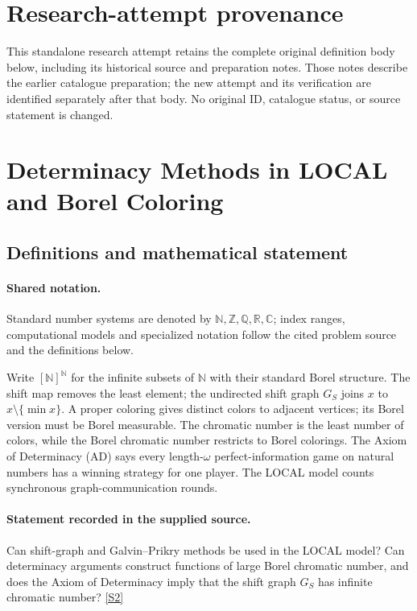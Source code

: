 \documentclass[11pt]{article}
\begin{document}
\section*{Research-attempt provenance}
This standalone research attempt retains the complete original definition body below,
including its historical source and preparation notes. Those notes describe the
earlier catalogue preparation; the new attempt and its verification are identified
separately after that body. No original ID, catalogue status, or source statement is changed.

\section{Determinacy Methods in LOCAL and Borel Coloring}\label{statement}

\subsection{Definitions and mathematical statement}

\paragraph{Shared notation.}Standard number systems are denoted by $\mathbb N,\mathbb Z,\mathbb Q,\mathbb R,\mathbb C$; index ranges, computational models and specialized notation follow the cited problem source and the definitions below.


Write $[\mathbb N]^{\mathbb N}$ for the infinite subsets of $\mathbb N$ with their standard Borel structure. The shift map removes the least element; the undirected shift graph $G_S$ joins $x$ to $x\setminus\{\min x\}$. A proper coloring gives distinct colors to adjacent vertices; its Borel version must be Borel measurable. The chromatic number is the least number of colors, while the Borel chromatic number restricts to Borel colorings. The Axiom of Determinacy (AD) says every length-$\omega$ perfect-information game on natural numbers has a winning strategy for one player. The LOCAL model counts synchronous graph-communication rounds.
\paragraph{Statement recorded in the supplied source.}
Can shift-graph and Galvin–Prikry methods be used in the LOCAL model? Can determinacy arguments construct functions of large Borel chromatic number, and does the Axiom of Determinacy imply that the shift graph $G_S$ has infinite chromatic number? \href{https://doi.org/10.4171/owr/2022/8}{[S2]}
\end{document}
